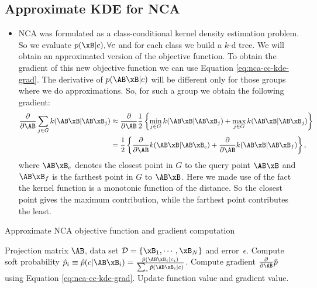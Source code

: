 \subsection{Approximate KDE for NCA}
\label{subsec:approx-KDE-for-NCA}
	\begin{itemize}
		\item NCA was formulated as a class-conditional kernel density estimation
problem. So we evaluate $p(\xB|c),\forall c$ and for each class we build a $k$-d
tree. We will obtain an approximated version of the objective function. To
obtain the gradient of this new objective function we can use Equation
\ref{eq:nca-cc-kde-grad}. The derivative of $p(\AB\xB|c)$ will be different only
for those groups where we do approximations. So, for such a group we obtain the
following gradient:
		\begin{align}
			\frac{\partial}{\partial \AB} \sum_{j\in G} k(\AB\xB|\AB\xB_j) &\approx
\frac{\partial}{\partial \AB} \frac{1}{2} \left\{\min_{j\in G}
k(\AB\xB|\AB\xB_j) + \max_{j\in G} k(\AB\xB|\AB\xB_j)\right\}\notag\\
			& = \frac{1}{2}\left\{ \frac{\partial}{\partial \AB} k(\AB\xB|\AB\xB_c) +
\frac{\partial}{\partial \AB} k(\AB\xB|\AB\xB_f) \right\},
		\end{align}
		where $\AB\xB_c$ denotes the closest point in $G$ to the query point $\AB\xB$
and $\AB\xB_f$ is the farthest point in $G$ to $\AB\xB$. Here we made use of the
fact the kernel function is a monotonic function of the distance. So the closest
point gives the maximum contribution, while the farthest point contributes the
least.
	\end{itemize}
	
	
	\begin{algorithm} 
		\caption{Approximate NCA objective function and gradient computation} 
		\label{alg:cc-kde-nca}  
		\begin{algorithmic}                    %
			\REQUIRE Projection matrix $\AB$, data set
$\mathcal{D}=\{\xB_1,\cdots,\xB_N\}$ and error~$\epsilon$.
			\ENDFOR 
				\ENDFOR
				\STATE Compute soft probability $\hat{p}_i \equiv \hat{p}(c|\AB\xB_i) =
\frac{\hat{p}(\AB\xB_i|c_i)}{\sum_{c}\hat{p}(\AB\xB_i|c)}$.
				\STATE Compute gradient $\frac{\partial}{\partial \AB} \hat{p}$ using
Equation \ref{eq:nca-cc-kde-grad}.
				\STATE Update function value and gradient value.
			\ENDFOR
		\end{algorithmic}
	\end{algorithm}
	
